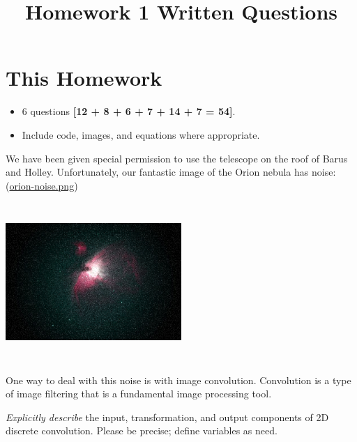 \documentclass{csci1430}
\begin{document}
\title{Homework 1 Written Questions}
\maketitle
\thispagestyle{fancy}

\writeinstructions

\section*{This Homework}
\begin{itemize}
    \item 6 questions \textbf{[12 + 8 + 6 + 7 + 14 + 7 = 54]}.
    \item Include code, images, and equations where appropriate.
\end{itemize}

\pagebreak

\begin{question}[points=12,drawbox=false]
We have been given special permission to use the telescope on the roof of Barus and Holley. Unfortunately, our fantastic image of the Orion nebula has noise: (\href{run:images/orion-noise.png}{orion-noise.png})

\includegraphics[width=0.5\textwidth,height=6cm,keepaspectratio]
{images/orion-noise.png}

One way to deal with this noise is with image convolution.
Convolution is a type of image filtering that is a fundamental image processing tool.
\end{question}

\begin{orangebox}
\emph{Explicitly describe} the input, transformation, and output components of 2D discrete convolution. Please be precise; define variables as need.
\end{orangebox}
\end{document}
